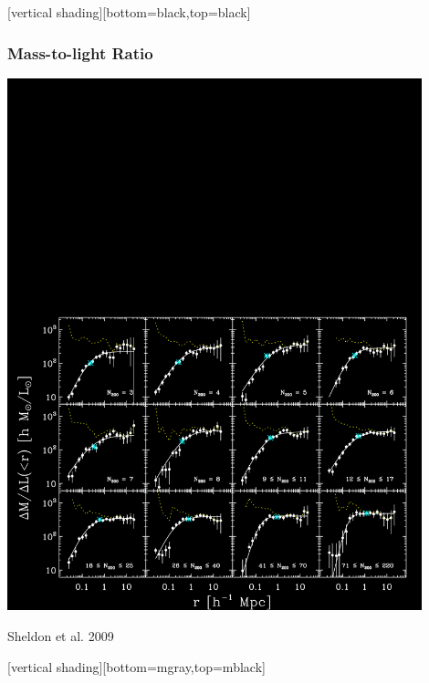 \documentclass{beamer}
\begin{document}
{
    [vertical shading][bottom=black,top=black]


    \frame
    {
        \frametitle{Mass-to-light Ratio}

        \begin{center}
            \includegraphics[trim=0 0 0 800,clip,width=0.9\textwidth]{m2l-ngals200_12-m21-22-l4-m2lfits-color.png}
        \end{center}
        \hfill {\color{gold} Sheldon et al. 2009}
    }
    [vertical shading][bottom=mgray,top=mblack]
}
\end{document}
